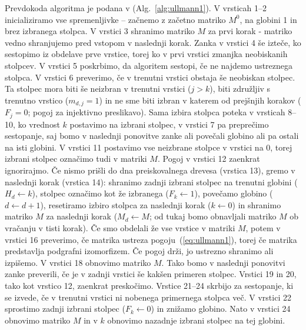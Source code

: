 \documentclass[a4paper, 12pt, ]{book}
\newcommand{\refalg}[1]{(Alg.~\ref{#1})}
\begin{document}
	Prevdokoda algoritma je podana v \refalg{alg:ullmann1}. V vrsticah 1--2 inicializiramo vse spremenljivke -- začnemo z začetno matriko $M^0$, 
	na globini 1 in brez izbranega stolpca. V vrstici 3 shranimo matriko $M$ za prvi korak - matriko vedno shranjujemo pred vstopom v naslednji korak. 	
	Zanka v vrstici 4 še izteče, ko sestopimo iz obdelave prve vrstice, torej ko v prvi vrstici zmanjka neobiskanih stolpcev. V vrstici 5 poskrbimo, da 
	algoritem sestopi, če ne najdemo ustreznega stolpca. V vrstici 6 preverimo, če v trenutni vrstici obstaja še neobiskan stolpec. Ta stolpec mora biti še
	neizbran v trenutni vrstici ($j > k$), biti združljiv s trenutno vrstico ($m_{d,j} = 1$) in ne sme biti izbran v	katerem od prejšnjih korakov ($F_j=0$;
	pogoj za injektivno preslikavo). Sama izbira stolpca poteka v vrsticah 8--10, ko vrednost $k$ postavimo na izbrani stolpec, v vrstici 7 pa preprečimo 
	sestopanje, saj bomo v naslednji ponovitve zanke ali povečali globino ali pa ostali na isti globini.
	V vrstici 11 postavimo vse neizbrane stolpce v vrstici na $0$, torej izbrani stolpec označimo tudi v matriki $M$. Pogoj v vrstici 12 zaenkrat ignorirajmo.
	Če nismo prišli do dna preiskovalnega
	drevesa (vrstica 13), gremo v naslednji korak (vrstica 14): shranimo zadnji izbrani stolpec na trenutni globini ($H_d \gets k$), stolpec označimo kot
	že izbranega ($F_k \gets 1$), povečamo globino ($d \gets d + 1$), resetiramo izbiro stolpca za naslednji korak ($k \gets 0$) in shranimo matriko $M$
	za naslednji korak ($M_d \gets M$; od tukaj bomo obnavljali matriko $M$ ob vračanju v tisti korak).
	Če smo obdelali že vse vrstice v matriki $M$, potem v vrstici 16 preverimo, če matrika ustreza pogoju~(\ref{eq:ullmann1}), torej če matrika predstavlja
	podgrafni izomorfizem. Če pogoj drži, jo ustrezno shranimo ali izpišemo. V vrstici 18 obnovimo matriko $M$. Tako bomo
	v naslednji ponovitvi zanke preverili, če je v zadnji vrstici še kakšen primeren stolpec. Vrstici 19 in 20, tako kot vrstico 12, zaenkrat preskočimo.
	Vrstice 21--24 skrbijo za sestopanje, ki se izvede, če v trenutni 
	vrstici ni nobenega primernega stolpca več. V vrstici 22 sprostimo zadnji izbrani stolpec ($F_k \gets 0$) in znižamo globino. Nato v vrstici 24 obnovimo
	matriko $M$ in v $k$ obnovimo nazadnje izbrani stolpec na tej globini.
	
\end{document}
